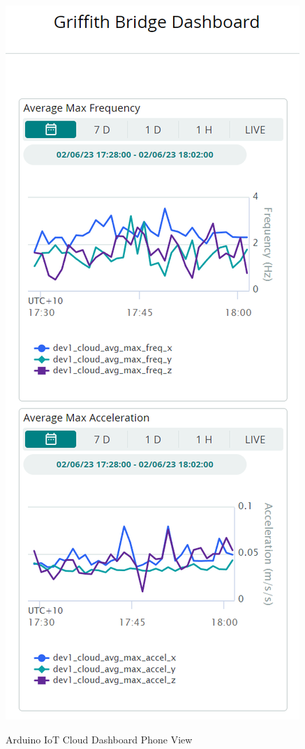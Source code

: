 \begin{figure}[H]
	\centering
	\caption{Arduino IoT Cloud Dashboard Phone View}
	\includegraphics[scale=0.6]{Sections/Appendix/dashboard-phone.png}
	\label{dashboard-phone}
\end{figure}